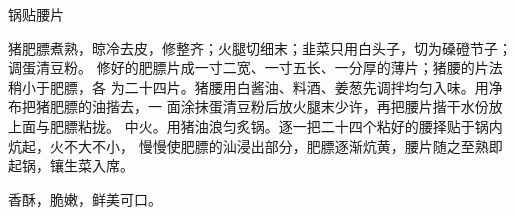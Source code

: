 \begin{recipe}{锅贴腰片}

\ingredients


\preparation

\step 猪肥膘煮熟，晾冷去皮，修整齐；火腿切细末；韭菜只用白头子，切为磉磴节子；
调蛋清豆粉。
\step 修好的肥膘片成一寸二宽、一寸五长、一分厚的薄片；猪腰的片法稍小于肥膘，各
为二十四片。猪腰用白酱油、料酒、姜葱先调拌均匀入味。用净布把猪肥膘的油揩去，一
面涂抹蛋清豆粉后放火腿末少许，再把腰片揩干水份放上面与肥膘粘拢。
\step 中火。用猪油浪匀炙锅。逐一把二十四个粘好的腰择贴于锅内炕起，火不大不小，
慢慢使肥膘的汕浸出部分，肥膘逐渐炕黄，腰片随之至熟即起锅，镶生菜入席。

\features

香酥，脆嫩，鲜美可口。

\end{recipe}

